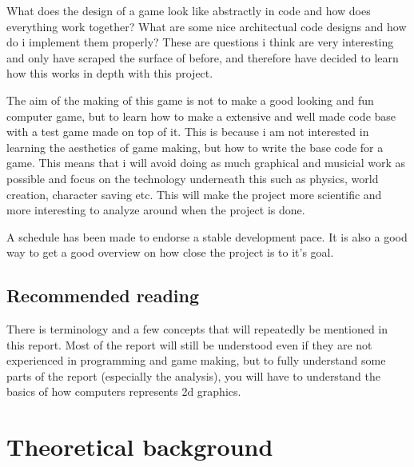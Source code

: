 \documentclass[a4paper,12pt]{article}
\begin{document}
What does the design of a game look like abstractly in code and how does everything work together?
What are some nice architectual code designs and how do i implement them properly?
These are questions i think are very interesting and only have scraped the surface of before, and therefore have decided to learn how this works in depth with this project.

The aim of the making of this game is not to make a good looking and fun computer game, but to learn how to make a extensive and well made code base with a test game made on top of it.
This is because i am not interested in learning the aesthetics of game making, but how to write the base code for a game.
This means that i will avoid doing as much graphical and musicial work as possible and focus on the technology underneath this such as physics, world creation, character saving etc.
This will make the project more scientific and more interesting to analyze around when the project is done.

A schedule has been made to endorse a stable development pace. It is also a good way to get a good overview on how close the project is to it's goal.


\subsection{Recommended reading}
There is terminology and a few concepts that will repeatedly be mentioned in this report.
Most of the report will still be understood even if they are not experienced in programming and game making, but to fully understand some parts of the report (especially the analysis), you will have to understand the basics of how computers represents 2d graphics.


\clearpage

\section{Theoretical background}
\end{document}
